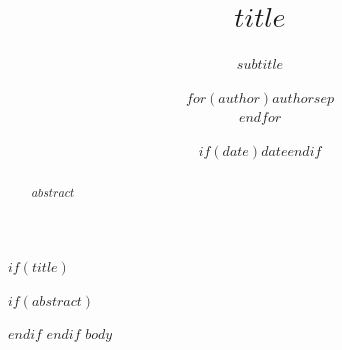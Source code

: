 \documentclass[$if(fontsize)$$fontsize$,$endif$a4paper,$if(lang)$$babel-lang$,$endif$]{article}
\title{$title$}
\subtitle{$subtitle$}
\author{$for(author)$$author$$sep$ \\ $endfor$}
\date{$if(date)$$date$$endif$}
\begin{document}
$if(title)$
\maketitle
$if(abstract)$
\begin{abstract}
$abstract$
\end{abstract}
$endif$
$endif$
$body$
\end{document}
